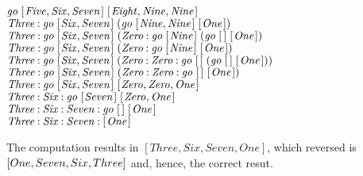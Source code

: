 \documentclass{scrreprt}
\newcommand{\Conid}[1]{\mathit{#1}}
\newcommand{\Varid}[1]{\mathit{#1}}
\begin{document}
\begin{minipage}{\textwidth}
\ensuremath{\Varid{go}\;[\mskip1.5mu \Conid{Five},\Conid{Six},\Conid{Seven}\mskip1.5mu]\;[\mskip1.5mu \Conid{Eight},\Conid{Nine},\Conid{Nine}\mskip1.5mu]}\\ 
\ensuremath{\Conid{Three}\mathbin{:}\Varid{go}\;[\mskip1.5mu \Conid{Six},\Conid{Seven}\mskip1.5mu]\;(\Varid{go}\;[\mskip1.5mu \Conid{Nine},\Conid{Nine}\mskip1.5mu]\;[\mskip1.5mu \Conid{One}\mskip1.5mu])}\\
\ensuremath{\Conid{Three}\mathbin{:}\Varid{go}\;[\mskip1.5mu \Conid{Six},\Conid{Seven}\mskip1.5mu]\;(\Conid{Zero}\mathbin{:}\Varid{go}\;[\mskip1.5mu \Conid{Nine}\mskip1.5mu]\;(\Varid{go}\;[\mskip1.5mu \mskip1.5mu]\;[\mskip1.5mu \Conid{One}\mskip1.5mu])}\\
\ensuremath{\Conid{Three}\mathbin{:}\Varid{go}\;[\mskip1.5mu \Conid{Six},\Conid{Seven}\mskip1.5mu]\;(\Conid{Zero}\mathbin{:}\Varid{go}\;[\mskip1.5mu \Conid{Nine}\mskip1.5mu]\;[\mskip1.5mu \Conid{One}\mskip1.5mu])}\\
\ensuremath{\Conid{Three}\mathbin{:}\Varid{go}\;[\mskip1.5mu \Conid{Six},\Conid{Seven}\mskip1.5mu]\;(\Conid{Zero}\mathbin{:}\Conid{Zero}\mathbin{:}\Varid{go}\;[\mskip1.5mu \mskip1.5mu]\;(\Varid{go}\;[\mskip1.5mu \mskip1.5mu]\;[\mskip1.5mu \Conid{One}\mskip1.5mu]))}\\
\ensuremath{\Conid{Three}\mathbin{:}\Varid{go}\;[\mskip1.5mu \Conid{Six},\Conid{Seven}\mskip1.5mu]\;(\Conid{Zero}\mathbin{:}\Conid{Zero}\mathbin{:}\Varid{go}\;[\mskip1.5mu \mskip1.5mu]\;[\mskip1.5mu \Conid{One}\mskip1.5mu])}\\
\ensuremath{\Conid{Three}\mathbin{:}\Varid{go}\;[\mskip1.5mu \Conid{Six},\Conid{Seven}\mskip1.5mu]\;[\mskip1.5mu \Conid{Zero},\Conid{Zero},\Conid{One}\mskip1.5mu]}\\
\ensuremath{\Conid{Three}\mathbin{:}\Conid{Six}\mathbin{:}\Varid{go}\;[\mskip1.5mu \Conid{Seven}\mskip1.5mu]\;[\mskip1.5mu \Conid{Zero},\Conid{One}\mskip1.5mu]}\\
\ensuremath{\Conid{Three}\mathbin{:}\Conid{Six}\mathbin{:}\Conid{Seven}\mathbin{:}\Varid{go}\;[\mskip1.5mu \mskip1.5mu]\;[\mskip1.5mu \Conid{One}\mskip1.5mu]}\\
\ensuremath{\Conid{Three}\mathbin{:}\Conid{Six}\mathbin{:}\Conid{Seven}\mathbin{:}[\mskip1.5mu \Conid{One}\mskip1.5mu]}\\
\end{minipage}

The computation results in $[Three,Six,Seven,One]$,
which reversed is $[One,Seven,Six,\\Three]$
and, hence, the correct resut.
\end{document}
